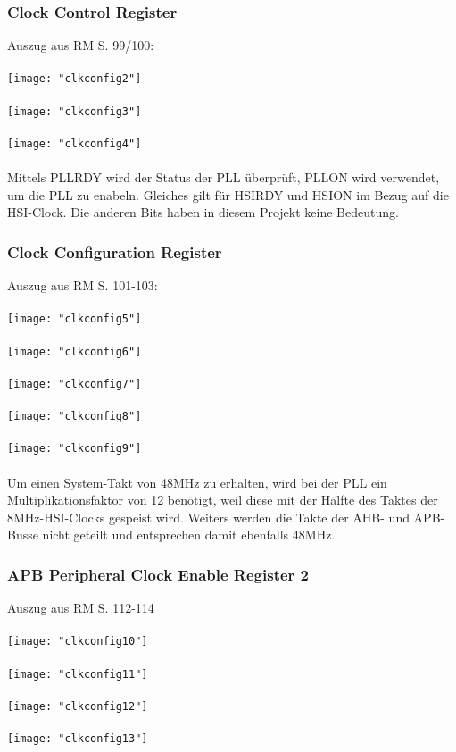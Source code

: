 \documentclass[11pt]{report}
\begin{document}
			\subsubsection{Clock Control Register}
				Auszug aus RM S. 99/100:\\
				\\\texttt{[image: "clkconfig2"]}\\
				\\\texttt{[image: "clkconfig3"]}\\
				\\\texttt{[image: "clkconfig4"]}\\
				\\Mittels PLLRDY wird der Status der PLL überprüft, PLLON wird verwendet, um die PLL zu enabeln. Gleiches gilt für HSIRDY und HSION im Bezug auf die HSI-Clock. Die anderen Bits haben in diesem Projekt keine Bedeutung.
			\subsubsection{Clock Configuration Register}
				Auszug aus RM S. 101-103:\\
				\\\texttt{[image: "clkconfig5"]}\\
				\\\texttt{[image: "clkconfig6"]}\\
				\\\texttt{[image: "clkconfig7"]}\\
				\\\texttt{[image: "clkconfig8"]}\\
				\\\texttt{[image: "clkconfig9"]}\\
				\\Um einen System-Takt von 48MHz zu erhalten, wird bei der PLL ein Multiplikationsfaktor von 12 benötigt, weil diese mit der Hälfte des Taktes der 8MHz-HSI-Clocks gespeist wird. Weiters werden die Takte der AHB- und APB-Busse nicht geteilt und entsprechen damit ebenfalls 48MHz.
			\subsubsection{APB Peripheral Clock Enable Register 2}
				Auszug aus RM S. 112-114\\
				\\\texttt{[image: "clkconfig10"]}\\
				\\\texttt{[image: "clkconfig11"]}\\
				\\\texttt{[image: "clkconfig12"]}\\
				\\\texttt{[image: "clkconfig13"]}\\
\end{document}
